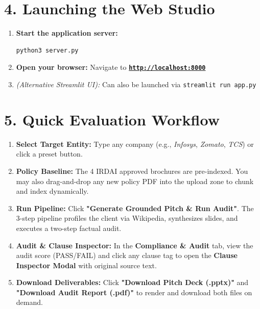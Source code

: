 \documentclass[11pt,a4paper]{article}
\begin{document}
\section*{4. Launching the Web Studio}
\begin{enumerate}
    \item \textbf{Start the application server:}
\begin{verbatim}
python3 server.py
\end{verbatim}
    \item \textbf{Open your browser:} Navigate to \href{http://localhost:8000}{\textbf{\texttt{http://localhost:8000}}}
    \item \textit{(Alternative Streamlit UI):} Can also be launched via \texttt{streamlit run app.py}
\end{enumerate}

\section*{5. Quick Evaluation Workflow}
\begin{enumerate}
    \item \textbf{Select Target Entity:} Type any company (e.g., \textit{Infosys}, \textit{Zomato}, \textit{TCS}) or click a preset button.
    \item \textbf{Policy Baseline:} The 4 IRDAI approved brochures are pre-indexed. You may also drag-and-drop any new policy PDF into the upload zone to chunk and index dynamically.
    \item \textbf{Run Pipeline:} Click \textbf{"Generate Grounded Pitch \& Run Audit"}. The 3-step pipeline profiles the client via Wikipedia, synthesizes slides, and executes a two-step factual audit.
    \item \textbf{Audit \& Clause Inspector:} In the \textbf{Compliance \& Audit} tab, view the audit score (PASS/FAIL) and click any clause tag to open the \textbf{Clause Inspector Modal} with original source text.
    \item \textbf{Download Deliverables:} Click \textbf{"Download Pitch Deck (.pptx)"} and \textbf{"Download Audit Report (.pdf)"} to render and download both files on demand.
\end{enumerate}
\end{document}
